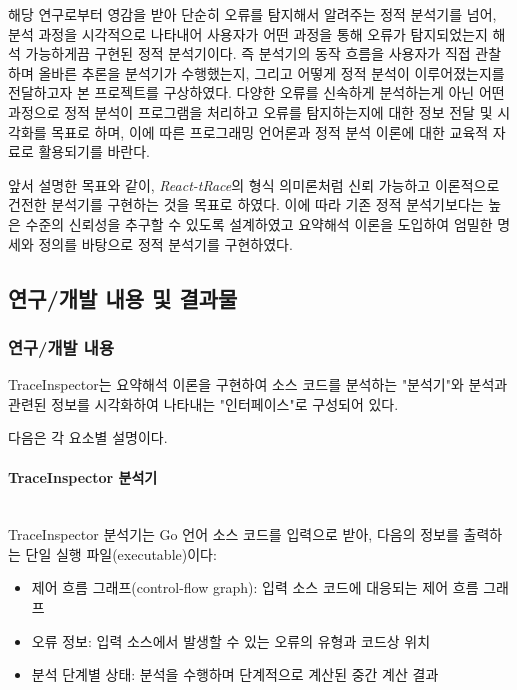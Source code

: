 \documentclass[a4paper,12pt]{article}
\newcommand{\traceinspector}{\textsf{TraceInspector}}
\begin{document}
 해당 연구로부터 영감을 받아 단순히 오류를 탐지해서 알려주는 정적 분석기를 넘어, 분석 과정을 시각적으로 나타내어 사용자가 어떤 과정을 통해 오류가 탐지되었는지 해석 가능하게끔 구현된 정적 분석기이다.
즉 분석기의 동작 흐름을 사용자가 직접 관찰하며 올바른 추론을 분석기가 수행했는지, 그리고 어떻게 정적 분석이 이루어졌는지를 전달하고자 본 프로젝트를 구상하였다.
다양한 오류를 신속하게 분석하는게 아닌 어떤 과정으로 정적 분석이 프로그램을 처리하고 오류를 탐지하는지에 대한 정보 전달 및 시각화를 목표로 하며, 이에 따른 프로그래밍 언어론과 정적 분석 이론에 대한 교육적 자료로 활용되기를 바란다.

앞서 설명한 목표와 같이, \textit{React-tRace}의 형식 의미론처럼 신뢰 가능하고 이론적으로 건전한 분석기를 구현하는 것을 목표로 하였다. 이에 따라 기존 정적 분석기보다는 높은 수준의 신뢰성을 추구할 수 있도록 설계하였고 요약해석 이론을 도입하여 엄밀한 명세와 정의를 바탕으로 정적 분석기를 구현하였다.


\subsection{연구/개발 내용 및 결과물}
\subsubsection{연구/개발 내용}
\textsf{TraceInspector}는 요약해석 이론을 구현하여 소스 코드를 분석하는 "분석기"와 분석과 관련된 정보를 시각화하여 나타내는 "인터페이스"로 구성되어 있다.

다음은 각 요소별 설명이다.

\paragraph{\textsf{TraceInspector} 분석기} ~\\

\textsf{TraceInspector} 분석기는 Go 언어 소스 코드를 입력으로 받아, 다음의 정보를 출력하는 단일 실행 파일(executable)이다:
\begin{itemize}
    \item 제어 흐름 그래프(control-flow graph): 입력 소스 코드에 대응되는 제어 흐름 그래프
    \item 오류 정보: 입력 소스에서 발생할 수 있는 오류의 유형과 코드상 위치
    \item 분석 단계별 상태: 분석을 수행하며 단계적으로 계산된 중간 계산 결과
\end{itemize}
\end{document}
